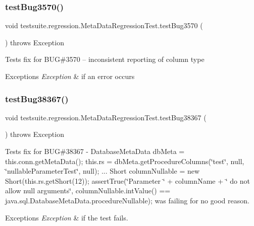 \subsubsection{\texorpdfstring{test\+Bug3570()}{testBug3570()}}
{\footnotesize\ttfamily void testsuite.\+regression.\+Meta\+Data\+Regression\+Test.\+test\+Bug3570 (\begin{DoxyParamCaption}{ }\end{DoxyParamCaption}) throws Exception}

Tests fix for B\+UG\#3570 -- inconsistent reporting of column type


\begin{DoxyExceptions}{Exceptions}
{\em Exception} & if an error occurs \\
\hline
\end{DoxyExceptions}
\mbox{\label{classtestsuite_1_1regression_1_1_meta_data_regression_test_a8ef9287c41ad42ae8faf6e7bb34a6fcb}} 
\subsubsection{\texorpdfstring{test\+Bug38367()}{testBug38367()}}
{\footnotesize\ttfamily void testsuite.\+regression.\+Meta\+Data\+Regression\+Test.\+test\+Bug38367 (\begin{DoxyParamCaption}{ }\end{DoxyParamCaption}) throws Exception}

Tests fix for B\+UG\#38367 -\/ Database\+Meta\+Data db\+Meta = this.\+conn.\+get\+Meta\+Data(); this.\+rs = db\+Meta.\+get\+Procedure\+Columns(\char`\"{}test\char`\"{}, null, \char`\"{}nullable\+Parameter\+Test\char`\"{}, null); ... Short column\+Nullable = new Short(this.\+rs.\+get\+Short(12)); assert\+True(\char`\"{}\+Parameter \char`\"{} + column\+Name + \char`\"{} do not allow null arguments\char`\"{}, column\+Nullable.\+int\+Value() == java.\+sql.\+Database\+Meta\+Data.\+procedure\+Nullable); was failing for no good reason.


\begin{DoxyExceptions}{Exceptions}
{\em Exception} & if the test fails. \\
\hline
\end{DoxyExceptions}
\mbox{\label{classtestsuite_1_1regression_1_1_meta_data_regression_test_a797ade6bff170eaf2551f5731a3dd7ef}} 
